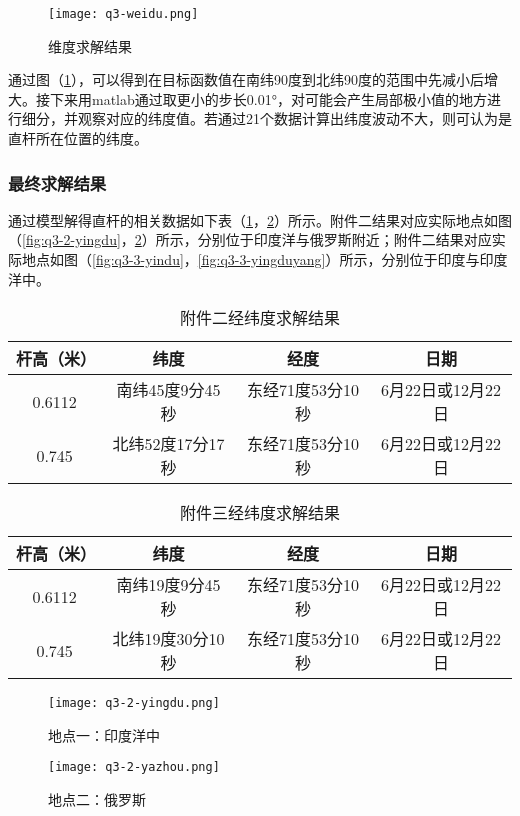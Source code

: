 \documentclass[withoutpreface,bwprint]{cumcmthesis} %
\begin{document}
\begin{figure}[h]
\small
\centering
\texttt{[image: q3-weidu.png]}
\caption{维度求解结果} \label{fig:q3-weidu}
\end{figure}


通过图（\ref{fig:q3-weidu}），可以得到在目标函数值在南纬90度到北纬90度的范围中先减小后增大。接下来用matlab通过取更小的步长0.01°，对可能会产生局部极小值的地方进行细分，并观察对应的纬度值。若通过21个数据计算出纬度波动不大，则可认为是直杆所在位置的纬度。


\subsubsection{最终求解结果}
通过模型解得直杆的相关数据如下表（\ref{q3-1经纬度求解结果}，\ref{q3-2经纬度求解结果}）所示。附件二结果对应实际地点如图（\ref{fig:q3-2-yingdu}，\ref{fig:q3-2-yazhou}）所示，分别位于印度洋与俄罗斯附近；附件二结果对应实际地点如图（\ref{fig:q3-3-yindu}，\ref{fig:q3-3-yingduyang}）所示，分别位于印度与印度洋中。
\begin{table}[!htbp]
\centering
\caption{附件二经纬度求解结果}
\label{q3-1经纬度求解结果}
\begin{tabular}{cccc}
\toprule
杆高（米）&纬度&经度 & 日期\\ 
\midrule
0.6112&南纬45度9分45秒&东经71度53分10秒&6月22日或12月22日\\
0.745&北纬52度17分17秒&东经71度53分10秒&6月22日或12月22日\\
\bottomrule 
\end{tabular}
\end{table}

\begin{table}[!htbp]
\centering
\caption{附件三经纬度求解结果}
\label{q3-2经纬度求解结果}
\begin{tabular}{cccc}
\toprule
杆高（米）&纬度&经度 & 日期\\ 
\midrule
0.6112&南纬19度9分45秒&东经71度53分10秒&6月22日或12月22日\\
0.745&北纬19度30分10秒&东经71度53分10秒&6月22日或12月22日\\
\bottomrule 
\end{tabular}
\end{table}


\begin{figure}[!htbp]  
\begin{minipage}[t]{0.5\textwidth}
\centering  
\texttt{[image: q3-2-yingdu.png]}
\caption{地点一：印度洋中} \label{fig:q3-2-yingdu}\end{minipage}
\hspace{1ex}
\begin{minipage}[t]{0.5\textwidth}  
\centering  
\texttt{[image: q3-2-yazhou.png]}
\caption{地点二：俄罗斯} \label{fig:q3-2-yazhou}
\end{minipage}  
\end{figure} 
\end{document}
